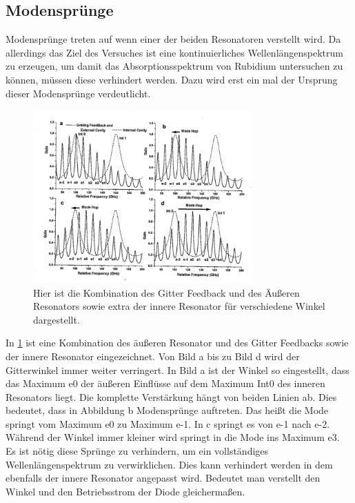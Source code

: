 \subsection{Modensprünge}
Modensprünge treten auf wenn einer der beiden Resonatoren verstellt wird.
Da allerdings das Ziel des Versuches ist eine kontinuierliches Wellenlängenspektrum zu erzeugen, um damit das Absorptionsspektrum von Rubidium untersuchen zu können, müssen diese verhindert werden.
Dazu wird erst ein mal der Ursprung dieser Modensprünge verdeutlicht. 
\begin{figure}[h!]
	\centering
	\includegraphics[width = 0.75\textwidth, angle = 1]{../Grafiken/Moden_Spruenge.pdf}
	\caption{Hier ist die Kombination des Gitter Feedback und des Äußeren Resonators sowie extra der innere Resonator für verschiedene Winkel dargestellt.\cite{V60}\label{fig:Moden_Spruenge}}
\end{figure}
In \cref{fig:Moden_Spruenge} ist eine Kombination des äußeren Resonator und des Gitter Feedbacks sowie der innere Resonator eingezeichnet.
Von Bild a bis zu Bild d wird der Gitterwinkel immer weiter verringert.
In Bild a ist der Winkel so eingestellt, dass das Maximum e0 der äußeren Einflüsse auf dem Maximum Int0 des inneren Resonators liegt.
Die komplette Verstärkung hängt von beiden Linien ab.
Dies bedeutet, dass in Abbildung b Modensprünge auftreten.
Das heißt die Mode springt vom Maximum e0 zu Maximum e-1.
In c springt es von e-1 nach e-2.
Während der Winkel immer kleiner wird springt in die Mode ins Maximum e3.\\
Es ist nötig diese Sprünge zu verhindern, um ein vollständiges Wellenlängenspektrum zu verwirklichen.
Dies kann verhindert werden in dem ebenfalls der innere Resonator angepasst wird.
Bedeutet man verstellt den Winkel und den Betriebsstrom der Diode gleichermaßen.